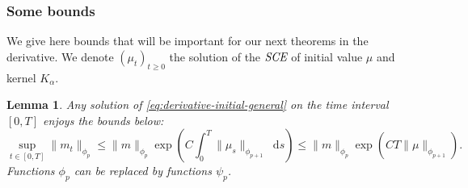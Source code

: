 \documentclass[11pt,a4paper]{article}
\newcommand{\SCE}{\emph{SCE}}
\newcommand{\Proc}[1]{\left(#1\right)_{t\geq 0}}
\newcommand{\dd}{\mathop{}\!\mathrm{d}}
\newtheorem{lemma}[theorem]{Lemma}
\begin{document}
\subsubsection{Some bounds}
We give here bounds that will be important for our next theorems in the derivative. We denote $\Proc{\mu_t}$ the solution of the $\SCE$ of initial value $\mu$ and kernel $K_\alpha$.
\begin{lemma}\label{lem:bound_derivative}
    Any solution of \eqref{eq:derivative-initial-general} on the time interval $[0,T]$ enjoys the bounds below:
    \[ \sup\limits_{t \in [0,T]}\| m_t\|_{\phi_p} \leq \| m\|_{\phi_p} \exp{\left( C\int_0^T\| \mu_s\|_{\phi_{p+1}} \dd s \right)} \leq \| m\|_{\phi_p} \exp{\left( CT\| \mu\|_{\phi_{p+1}}\right)}.\]
    Functions $\phi_p$ can be replaced by functions $\psi_p$.
\end{lemma}
\end{document}
